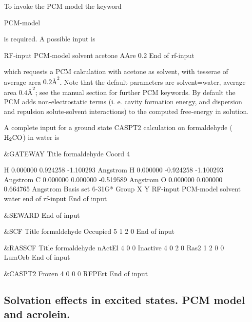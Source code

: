 To invoke the PCM model the keyword

\begin{inputlisting}
PCM-model
\end{inputlisting}

is required. A possible input is

\begin{inputlisting}
RF-input
PCM-model
solvent
acetone
AAre
0.2
End of rf-input
\end{inputlisting}

which requests a PCM calculation with acetone as solvent, with tesserae
of average area $0.2\mbox{\AA}^2$. Note that the default parameters are
solvent=water, average area $0.4\mbox{\AA}^2$; see the 
manual section for further PCM keywords. By default the PCM adds
non-electrostatic terms (i. e. cavity formation energy, and dispersion
and repulsion solute-solvent interactions) to the computed free-energy
in solution.

A complete input for a ground state CASPT2 calculation on formaldehyde
($\rm H_2CO$) in water is

\begin{inputlisting}
&GATEWAY
Title
formaldehyde
Coord
4

H      0.000000    0.924258   -1.100293    Angstrom
H      0.000000   -0.924258   -1.100293    Angstrom
C      0.000000    0.000000   -0.519589    Angstrom
O      0.000000    0.000000    0.664765    Angstrom
Basis set
 6-31G*
Group
 X Y
RF-input
PCM-model
solvent
water
end of rf-input
End of input

&SEWARD
End of input

&SCF
Title
formaldehyde
Occupied
5 1 2 0
End of input

&RASSCF
Title
formaldehyde
nActEl
4 0 0
Inactive
4 0 2 0
Ras2
1 2 0 0
LumOrb
End of input

&CASPT2
Frozen
4  0  0  0
RFPErt
End of input
\end{inputlisting}

\subsection{Solvation effects in excited states. PCM model and acrolein.}

